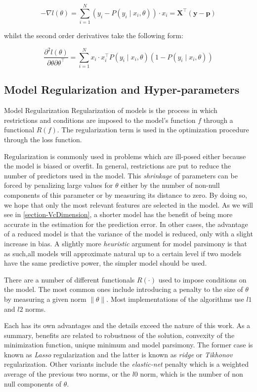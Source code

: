 \[
- \nabla  l(\theta) = \sum_{i=1}^N (y_i - P(y_i \mid x_i,\theta))\cdot x_i = \textbf{X}^{\intercal}(\textbf{y}-\textbf{p})
\]

whilst the second order derivatives take the following form:

\[
\frac{\partial^2 l(\theta)}{\partial \theta \partial \theta^\intercal} = \sum_{i=1}^N x_i \cdot x_i^\intercal P(y_i \mid x_i,\theta)(1 -P(y_i \mid x_i,\theta))
\]



\subsection{Model Regularization and Hyper-parameters} \label{subsection-hyperParametersRegularization}


\begin{definition}{Model Regularization}
	Regularization of models is the process in which restrictions and conditions are imposed  to the model's function $f$ through a functional $ R(f)$. The regularization term is used in the optimization procedure through the loss function.
\end{definition}

Regularization is commonly used in problems which are ill-posed either because the model is biased or overfit. In general, restrictions are put to reduce the number of predictors used in the model. This \textit{shrinkage} of parameters can be forced by penalizing large values for $\theta$ either by the number of non-null components of this parameter or by measuring its distance to zero. By doing so, we hope that only the most relevant features are selected in the model. As we will see in \ref{section-VcDimension}, a shorter model has the benefit of being more accurate in the estimation for the prediction error. In other cases, the advantage of a reduced model is that the variance of the model is reduced, only with a slight increase in bias. A slightly more \textit{heuristic} argument for model parsimony is that as such,all models will approximate natural up to a certain level if two models have the same predictive power, the simpler model should be used.


There are a number of different functionals $R(\cdot)$ used to impose conditions on the model. The most common ones include introducing a penalty to the size of $\theta$ by measuring a given norm  $\| \theta \|$.  Most implementations of the algorithms use $l1$ and $l2$ norms.

 Each has its own advantages and the details exceed the nature of this work. As a summary, benefits are related to robustness of the solution, convexity of the minimization function, unique minimum and model parsimony. The former case is known as \textit{ Lasso} regularization and the latter is known as \textit{ridge} or \textit{Tikhonov} regularization. Other variants include the \textit{elastic-net} penalty which is a weighted average of the previous two norms, or the $l0$ norm, which is the number of non null components of $\theta$. 


